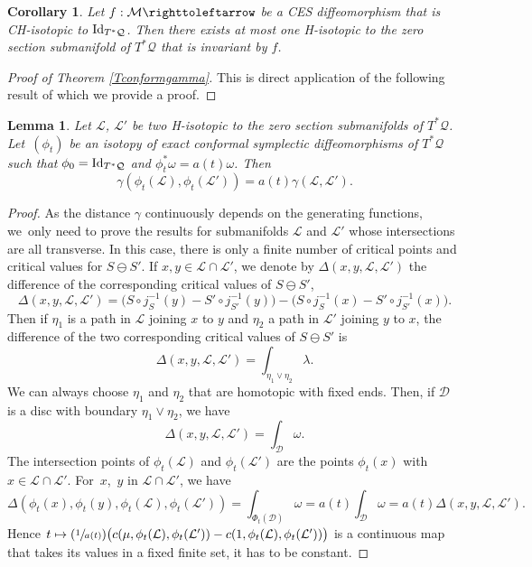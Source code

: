 \documentclass[10pt]{amsart}
\newcommand{\Psfrac}[2]{(\sfrac{#1}{#2})}
\def\mto{\mathchoice{\longmapsto}{\mapsto}{\mapsto}{\mapsto}}
\newtheorem{corollary}{Corollary}
\newtheorem{lemma}{Lemma}
\theoremstyle{definition}
\def\cD{{\mathcal D}}
\def\cL{{\mathcal L}}
\def\cM{{\mathcal M}}
\def\cQ{{\mathcal Q}}
\begin{document}
\begin{corollary}\label{Cunicityinavariant}
Let $f:\cM \righttoleftarrow$ be a CES diffeomorphism that is CH-isotopic to ${\rm Id}_{T^*\cQ}$. Then there exists at most one H-isotopic to the zero section submanifold of $T^*\cQ$ that is invariant by $f$.
\end{corollary}

\begin{proof}[Proof of Theorem \ref{Tconformgamma}]
This is direct application of the following result of which we provide a proof.
\end{proof}

\begin{lemma}\label{Lconformgamma}
Let $\cL$, $\cL'$ be two H-isotopic to the zero section submanifolds of $T^*\cQ$. Let~$(\phi_t)$ be an isotopy of exact conformal symplectic diffeomorphisms of $T^*\cQ$ such that $\phi_0={\rm Id}_{T^*\cQ}$ and $\phi_t^*\omega=a(t)\omega$. Then
\[
\gamma(\phi_t(\cL), \phi_t(\cL'))=a(t)\gamma(\cL, \cL').
\]
\end{lemma}

\begin{proof} As the distance $\gamma$ continuously depends on the generating functions, we~only need to prove the results for submanifolds $\cL$ and $\cL'$ whose intersections are all transverse. In this case, there is only a finite number of critical points and critical values for $S\ominus S'$. If $x, y\in\cL\cap\cL'$, we denote by $\Delta(x, y, \cL, \cL')$ the difference of the corresponding critical values of $S\ominus S'$, \ie
\[
\Delta(x, y, \cL, \cL')=\Big(S\circ j_S^{-1}(y)-S'\circ j_{S'}^{-1}(y)\Big)-\Big(S\circ j_S^{-1}(x)-S'\circ j_{S'}^{-1}(x)\Big).
\]
Then if $\eta_1$ is a path in $\cL$ joining $x$ to $y$ and $\eta_2$ a path in $\cL'$ joining $y$ to $x$, the difference of the two corresponding critical values of $S\ominus S'$ is
\[
\Delta(x, y, \cL, \cL')=\int_{\eta_1\vee\eta_2}\lambda.
\]
We can always choose $\eta_1$ and $\eta_2$ that are homotopic with fixed ends. Then, if $\cD$ is a disc with boundary $\eta_1\vee\eta_2$, we have
\[
\Delta(x, y, \cL, \cL')=\int_{\cD}\omega.
\]
The intersection points of $\phi_t(\cL)$ and $\phi_t(\cL')$ are the points $\phi_t(x)$ with $x\in\cL\cap \cL'$. For~$x$,~$y$ in $\cL\cap\cL'$, we have
\[
\Delta(\phi_t(x), \phi_t(y), \phi_t(\cL), \phi_t(\cL'))=\int_{\Phi_t(\cD)}\omega=a(t)\int_\cD\omega=a(t)\Delta(x, y, \cL, \cL').
\]
Hence $t\mto \Psfrac{1}{a(t)}\big(c(\mu, \phi_t(\cL), \phi_t(\cL'))-c(1, \phi_t(\cL), \phi_t(\cL'))\big)$ is a continuous map that takes its values in a fixed finite set, it has to be constant.
\end{proof}
\end{document}
